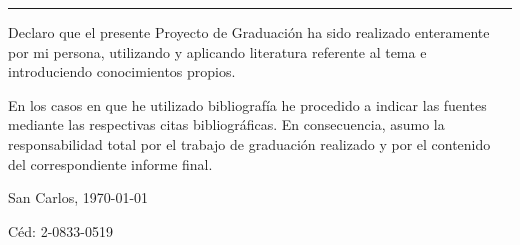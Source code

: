 \thispagestyle{empty}

\rule{10mm}{0pt}

\vfill

Declaro que el presente Proyecto de Graduación ha sido realizado enteramente
por mi persona, utilizando y aplicando literatura referente al tema e
introduciendo conocimientos propios.

En los casos en que he utilizado bibliografía he procedido a indicar las
fuentes mediante las respectivas citas bibliográficas. En consecuencia,
asumo la responsabilidad total por el trabajo de graduación realizado y por
el contenido del correspondiente informe final.

\vspace*{8mm}

\begin{flushright}
  \scriptAuthor\par
  San Carlos, \today\par
  Céd: 2-0833-0519
\end{flushright}

\cleardoublepage


